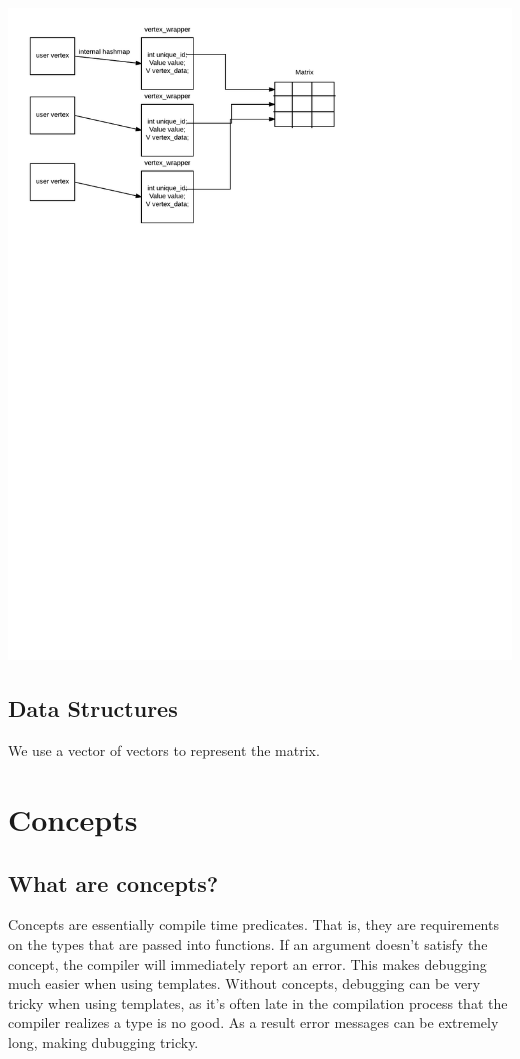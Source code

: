 \documentclass{article}
\begin{document}
\includegraphics{matrix}

\subsection{Data Structures}
We use a vector of vectors to represent the matrix. 

\section{Concepts}
\subsection{What are concepts?}
Concepts are essentially compile time predicates. That is, they are requirements on the types that are passed into functions. If an argument doesn't satisfy the concept, the compiler will immediately report an error. This makes debugging much easier when using templates. Without concepts, debugging can be very tricky when using templates, as it's often late in the compilation process that the compiler realizes a type is no good. As a result error messages can be extremely long, making dubugging tricky. 
\end{document}
